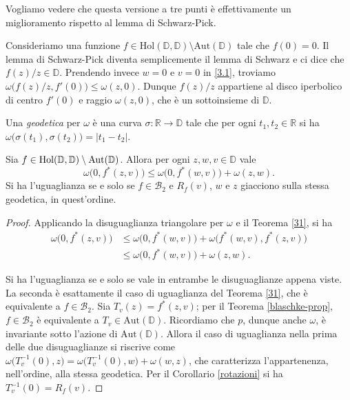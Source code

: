Vogliamo vedere che questa versione a tre punti è effettivamente un miglioramento rispetto al lemma di Schwarz-Pick.

\begin{ex}
  Consideriamo una funzione $f \in \text{Hol}(\mathbb{D},\mathbb{D})\setminus\text{Aut}(\mathbb{D})$ tale che $f(0)=0$. Il lemma di Schwarz-Pick diventa semplicemente il lemma di Schwarz e ci dice che $f(z)/z \in \mathbb{D}$. Prendendo invece $w=0$ e $v=0$ in \eqref{3.1}, troviamo $\omega\bigl(f(z)/z,f'(0)\bigr) \le \omega(z,0)$.
  Dunque $f(z)/z$ appartiene al disco iperbolico di centro $f'(0)$ e raggio $\omega(z,0)$, che è un sottoinsieme di $\mathbb{D}$.
\end{ex}

\begin{defn}
  Una \textit{geodetica} per $\omega$ è una curva $\sigma: \mathbb{R} \longrightarrow \mathbb{D}$ tale che per ogni $t_1,t_2 \in \mathbb{R}$ si ha $\omega\bigl(\sigma(t_1),\sigma(t_2)\bigr)=|t_1-t_2|$.
\end{defn}

\begin{cor} \label{32}
  Sia $f \in \text{\normalfont{Hol}}(\mathbb{D},\mathbb{D})\setminus\text{\normalfont{Aut}}(\mathbb{D})$. Allora per ogni $z, w, v \in \mathbb{D}$ vale
  \begin{equation}
    \omega\bigl(0, f^*(z,v)\bigr) \le \omega\bigl(0,f^*(w,v)\bigr)+\omega(z,w).
  \end{equation}
  Si ha l'uguaglianza se e solo se $f \in \mathcal{B}_2$ e $R_f(v)$, $w$ e $z$ giacciono sulla stessa geodetica, in quest'ordine.
\end{cor}

\begin{proof}
  Applicando la disuguaglianza triangolare per $\omega$ e il Teorema \ref{31}, si ha
  \begin{align*}
    \omega\bigl(0,f^*(z,v)\bigr) & \le \omega\bigl(0,f^*(w,v)\bigr)+\omega\bigl(f^*(w,v),f^*(z,v)\bigr) \\
    & \le \omega\bigl(0,f^*(w,v)\bigr)+\omega(z,w).
  \end{align*}

  Si ha l'uguaglianza se e solo se vale in entrambe le disuguaglianze appena viste. La seconda è esattamente il caso di uguaglianza del Teorema \ref{31}, che è equivalente a $f \in \mathcal{B}_2$. Sia $T_v(z)=f^*(z,v)$; per il Teorema \ref{blaschke-prop}, $f \in \mathcal{B}_2$ è equivalente a $T_v \in \text{Aut}(\mathbb{D})$. Ricordiamo che $p$, dunque anche $\omega$, è invariante sotto l'azione di $\text{Aut}(\mathbb{D})$.
  Allora il caso di uguaglianza nella prima delle due disuguaglianze si riscrive come $\omega\bigl(T_v^{-1}(0),z\bigr)=\omega\bigl(T_v^{-1}(0),w\bigr)+\omega(w,z)$, che caratterizza l'appartenenza, nell'ordine, alla stessa geodetica. Per il Corollario \ref{rotazioni} si ha $T_v^{-1}(0)=R_f(v)$.
\end{proof}

